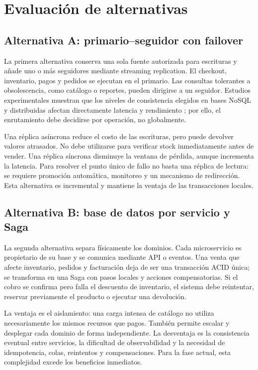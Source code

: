 \documentclass[11pt,a4paper]{article}
\begin{document}
\section{Evaluación de alternativas}

\subsection{Alternativa A: primario--seguidor con failover}

La primera alternativa conserva una sola fuente autorizada para escrituras y añade uno o más seguidores mediante streaming replication. El checkout, inventario, pagos y pedidos se ejecutan en el primario. Las consultas tolerantes a obsolescencia, como catálogo o reportes, pueden dirigirse a un seguidor. Estudios experimentales muestran que los niveles de consistencia elegidos en bases NoSQL y distribuidas afectan directamente latencia y rendimiento \cite{ferreira2025benchmarking}; por ello, el enrutamiento debe decidirse por operación, no globalmente.

Una réplica asíncrona reduce el costo de las escrituras, pero puede devolver valores atrasados. No debe utilizarse para verificar stock inmediatamente antes de vender. Una réplica síncrona disminuye la ventana de pérdida, aunque incrementa la latencia. Para resolver el punto único de fallo no basta una réplica de lectura: se requiere promoción automática, monitoreo y un mecanismo de redirección. Esta alternativa es incremental y mantiene la ventaja de las transacciones locales.

\subsection{Alternativa B: base de datos por servicio y Saga}

La segunda alternativa separa físicamente los dominios. Cada microservicio es propietario de su base y se comunica mediante API o eventos. Una venta que afecte inventario, pedidos y facturación deja de ser una transacción ACID única; se transforma en una Saga con pasos locales y acciones compensatorias. Si el cobro se confirma pero falla el descuento de inventario, el sistema debe reintentar, reservar previamente el producto o ejecutar una devolución.

La ventaja es el aislamiento: una carga intensa de catálogo no utiliza necesariamente los mismos recursos que pagos. También permite escalar y desplegar cada dominio de forma independiente. La desventaja es la consistencia eventual entre servicios, la dificultad de observabilidad y la necesidad de idempotencia, colas, reintentos y compensaciones. Para la fase actual, esta complejidad excede los beneficios inmediatos.
\end{document}
